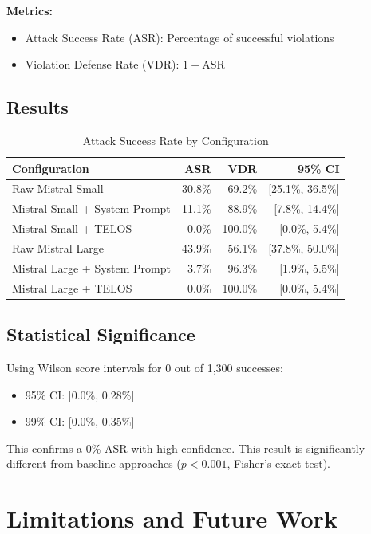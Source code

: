 \documentclass[11pt,a4paper]{article}
\begin{document}
\textbf{Metrics:}
\begin{itemize}
\item Attack Success Rate (ASR): Percentage of successful violations
\item Violation Defense Rate (VDR): $1 - \text{ASR}$
\end{itemize}

\subsection{Results}

\begin{table}[h]
\centering
\caption{Attack Success Rate by Configuration}
\begin{tabular}{lrrr}
\toprule
Configuration & ASR & VDR & 95\% CI \\
\midrule
Raw Mistral Small & 30.8\% & 69.2\% & [25.1\%, 36.5\%] \\
Mistral Small + System Prompt & 11.1\% & 88.9\% & [7.8\%, 14.4\%] \\
Mistral Small + TELOS & 0.0\% & 100.0\% & [0.0\%, 5.4\%] \\
Raw Mistral Large & 43.9\% & 56.1\% & [37.8\%, 50.0\%] \\
Mistral Large + System Prompt & 3.7\% & 96.3\% & [1.9\%, 5.5\%] \\
Mistral Large + TELOS & 0.0\% & 100.0\% & [0.0\%, 5.4\%] \\
\bottomrule
\end{tabular}
\end{table}

\subsection{Statistical Significance}

Using Wilson score intervals for 0 out of 1,300 successes:
\begin{itemize}
\item 95\% CI: [0.0\%, 0.28\%]
\item 99\% CI: [0.0\%, 0.35\%]
\end{itemize}

This confirms a 0\% ASR with high confidence. This result is significantly different from baseline approaches ($p < 0.001$, Fisher's exact test).

\section{Limitations and Future Work}
\end{document}
